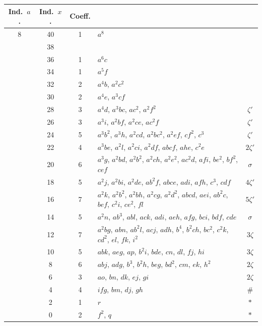 \documentclass[11pt,a4paper]{article}
\begin{document}
\begin{center}
\begin{tabular}{ccc|l|c}
Ind.\ $a$. & Ind.\ $x$. & Coeff. & & \\\hline
8 & 40 & 1 & $a^{8}$ & \\
& 38 & & & \\
& 36 & 1 & $a^{6}c$ & \\
& 34 & 1 & $a^{5}f$ & \\
& 32 & 2 & $a^{4}b$, $a^{2}c^{2}$ & \\
& 30 & 2 & $a^{4}e$, $a^{3}cf$ & \\
& 28 & 3 & $a^{4}d$, $a^{3}bc$, $ac^{2}$, $a^{2}f^{2}$ & $\zeta'$\\
& 26 & 3 & $a^{3}i$, $a^{2}bf$, $a^{2}ce$, $ac^{2}f$ & $\zeta'$\\
& 24 & 5 & $a^{3}b^{2}$, $a^{3}h$, $a^{2}cd$, $a^{2}bc^{2}$, $a^{2}ef$, $cf^{2}$, $c^{3}$ & $\zeta'$\\
& 22 & 4 & $a^{3}be$, $a^{2}l$, $a^{2}ci$, $a^{2}df$, $abcf$, $ahe$, $c^{2}e$ & $2\zeta'$\\
& 20 & 6 & $a^{3}g$, $a^{2}bd$, $a^{2}b^{2}$, $a^{2}ch$, $a^{2}e^{2}$, $ac^{2}d$, $afi$, $be^{2}$, $bf^{2}$, $cef$ & $\sigma$\\
& 18 & 5 & $a^{2}j$, $a^{2}bi$, $a^{2}de$, $ab^{2}f$, $abce$, $adi$, $afh$, $c^{3}$, $cdf$ & $4\zeta'$\\
& 16 & 7 & $a^{2}k$, $a^{2}b^{2}$, $a^{2}bh$, $a^{2}cg$, $a^{2}d^{2}$, $abcd$, $aei$, $ab^{2}c$, $bef$, $c^{2}i$, $ce^{2}$, $fl$ & $5\zeta'$\\
& 14 & 5 & $a^{2}n$, $ab^{3}$, $abl$, $ack$, $adi$, $aeh$, $afg$, $bci$, $bdf$, $cde$ & $\sigma$\\
& 12 & 7 & $a^{2}bg$, $abn$, $ab^{2}l$, $acj$, $adh$, $b^{4}$, $b^{2}ch$, $bc^{2}$, $c^{2}k$, $cd^{2}$, $el$, $fk$, $i^{2}$ & $3\zeta$\\
& 10 & 5 & $abk$, $aeg$, $ap$, $b^{2}i$, $bde$, $cn$, $dl$, $fj$, $hi$ & $3\zeta$\\
& 8 & 6 & $abj$, $adg$, $b^{3}$, $b^{2}h$, $beg$, $bd^{2}$, $cm$, $ek$, $h^{2}$ & $2\zeta$\\
& 6 & 3 & $ao$, $bn$, $dk$, $ej$, $gi$ & $2\zeta$\\
& 4 & 4 & $ifg$, $bm$, $dj$, $gh$ & $\#$\\
& 2 & 1 & $r$ & $*$\\
& 0 & 2 & $f^{2}$, $q$ & $*$
\end{tabular}
\end{center}

\newpage
\setcounter{page}{346}
\end{document}
